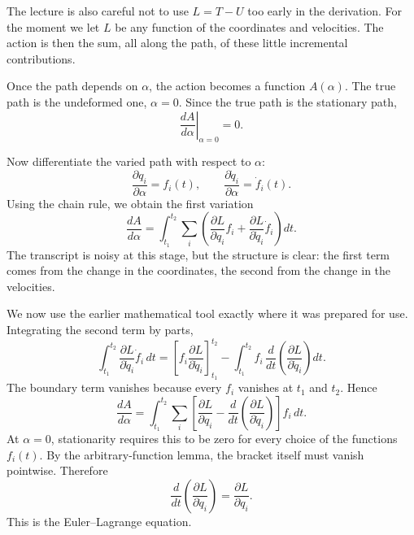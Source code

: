 The lecture is also careful not to use \(L=T-U\) too early in the derivation. For the moment we let \(L\) be any function of the coordinates and velocities. The action is then the sum, all along the path, of these little incremental contributions.

Once the path depends on \(\alpha\), the action becomes a function \(A(\alpha)\). The true path is the undeformed one, \(\alpha=0\). Since the true path is the stationary path,
\begin{equation}
\left.\frac{dA}{d\alpha}\right|_{\alpha=0}=0.
\end{equation}

Now differentiate the varied path with respect to \(\alpha\):
\begin{equation}
\frac{\partial q_i}{\partial \alpha}=f_i(t),
\qquad
\frac{\partial \dot q_i}{\partial \alpha}=\dot f_i(t).
\end{equation}
Using the chain rule, we obtain the first variation
\begin{equation}
\frac{dA}{d\alpha}
=
\int_{t_1}^{t_2}\sum_i
\left(
\frac{\partial L}{\partial q_i}f_i
+
\frac{\partial L}{\partial \dot q_i}\dot f_i
\right)dt.
\end{equation}
The transcript is noisy at this stage, but the structure is clear: the first term comes from the change in the coordinates, the second from the change in the velocities.

We now use the earlier mathematical tool exactly where it was prepared for use. Integrating the second term by parts,
\begin{equation}
\int_{t_1}^{t_2}\frac{\partial L}{\partial \dot q_i}\dot f_i\,dt
=
\left[
f_i\frac{\partial L}{\partial \dot q_i}
\right]_{t_1}^{t_2}
-
\int_{t_1}^{t_2}
f_i\,\frac{d}{dt}\left(\frac{\partial L}{\partial \dot q_i}\right)dt.
\end{equation}
The boundary term vanishes because every \(f_i\) vanishes at \(t_1\) and \(t_2\). Hence
\begin{equation}
\frac{dA}{d\alpha}
=
\int_{t_1}^{t_2}\sum_i
\left[
\frac{\partial L}{\partial q_i}
-
\frac{d}{dt}\left(\frac{\partial L}{\partial \dot q_i}\right)
\right]f_i\,dt.
\end{equation}
At \(\alpha=0\), stationarity requires this to be zero for every choice of the functions \(f_i(t)\). By the arbitrary-function lemma, the bracket itself must vanish pointwise. Therefore
\begin{equation}
\frac{d}{dt}\left(\frac{\partial L}{\partial \dot q_i}\right)
=
\frac{\partial L}{\partial q_i}.
\end{equation}
This is the Euler--Lagrange equation.

